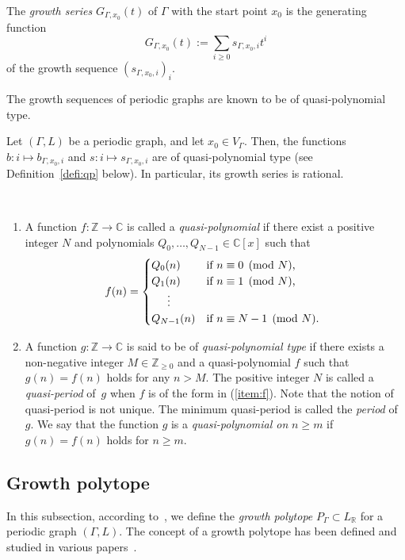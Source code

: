 The \textit{growth series} $G_{\Gamma, x_0}(t)$ of $\Gamma$ with the start point $x_0$ is the generating function 
\[
G_{\Gamma, x_0}(t) := \sum _{i \ge 0} s_{\Gamma, x_0,i} t^i
\]
of the growth sequence $(s_{\Gamma, x_0,i})_{i}$. 


The growth sequences of periodic graphs are known to be of quasi-polynomial type. 
\begin{thm}\label{thm:NSMN}
Let $(\Gamma, L)$ be a periodic graph, and let $x_0 \in V_{\Gamma}$. 
Then, the functions $b: i \mapsto b_{\Gamma, x_0, i}$ and $s: i \mapsto s_{\Gamma, x_0, i}$ are of quasi-polynomial type (see Definition~\ref{defi:qp} below). 
In particular, its growth series is rational. 
\end{thm}

\begin{defn}\label{defi:qp} \,
\begin{enumerate}
\item \label{item:f}
A function $f: \mathbb{Z} \to \mathbb{C}$ is called a \textit{quasi-polynomial} 
if there exist a positive integer $N$ and polynomials $Q_0, \ldots, Q_{N-1} \in \mathbb{C}[x]$ such that 
\[
f(n) = \begin{cases} 
Q_0(n) & \text{if $n \equiv 0 \pmod N$, } \\
Q_1(n) & \text{if $n \equiv 1 \pmod N$, } \\
\hspace{5mm} \vdots & \\
Q_{N-1}(n) & \text{if $n \equiv N-1 \pmod N$. }
\end{cases}
\]

\item 
A function $g: \mathbb{Z} \to \mathbb{C}$ is said to be of \textit{quasi-polynomial type} if 
there exists a non-negative integer $M \in \mathbb{Z}_{\ge 0}$ and a quasi-polynomial $f$ such that
$g(n) = f(n)$ holds for any $n > M$. 
The positive integer $N$ is called a \textit{quasi-period} of~$g$ when $f$ is of the form in (\ref{item:f}). 
Note that the notion of quasi-period is not unique. 
The minimum quasi-period is called the \textit{period} of $g$. 
We say that the function $g$ is a \textit{quasi-polynomial on} $n \ge m$ if 
$g(n) = f(n)$ holds for $n \ge m$. 
\end{enumerate}
\end{defn}


\subsection{Growth polytope} \label{subsection:GP}
In this subsection, according to~\cite{IN}, we define the \textit{growth polytope} $P_{\Gamma} \subset L_{\mathbb{R}}$ for a periodic graph $(\Gamma, L)$. The concept of a growth polytope has been defined and studied in various papers~\cite{KS02, KS06, Zhu02, Eon04, MS11, Fri13, ACIK}. 


